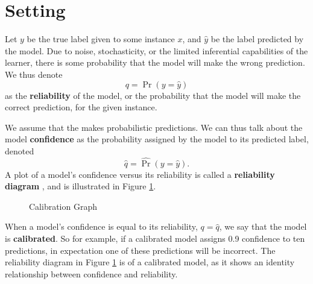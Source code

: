 
\section{Setting} \label{cddm:setting}

Let $y$ be the true label given to some instance $x$, and $\hat{y}$ be the label predicted by the model. Due to noise, stochasticity, or the limited inferential capabilities of the learner, there is some probability that the model will make the wrong prediction. We thus denote
\begin{equation}
q = \Pr(y=\hat{y})
\end{equation}
as the {\bf reliability} of the model, or the probability that the model will make the correct prediction, for the given instance. 

We assume that the makes probabilistic predictions. We can thus talk about the model {\bf confidence} as the probability assigned by the model to its predicted label, denoted
\begin{equation}
\hat{q} = \hat{\Pr}(y=\hat{y}).
\end{equation}
A plot of a model's confidence versus its reliability is called a {\bf reliability diagram} \cite{calibrating}, and is illustrated in Figure \ref{fig:calibration}. 

\newcommand{\calibrationgraph}[7][]{
    \draw [thick, <->] (0,1.25) -- (0,0) -- (1.25,0);
    \node [below] at (1.25,0) {$\hat{q}$};
    14
    \node [left] at (0,1.25) {$q$};
    \node [left] at (0,#7) {$q_t$};
    \node [below] at (#6,0) {$\hat{q}_t$};
    \draw (#2,#3) -- (#4,#5);
    \draw [red] (#6,0) -- (#6,#7);
    \draw [red, dashed] (0,#7) -- (#6,#7);
}

\begin{figure}
    \centering
    \caption{Calibration Graph}
    \label{fig:calibration}
\end{figure}

When a model's confidence is equal to its reliability, $q=\hat{q}$, we say that the model is {\bf calibrated}. So for example, if a calibrated model assigns 0.9 confidence to ten predictions, in expectation one of these predictions will be incorrect. The reliability diagram in Figure \ref{fig:calibration} is of a calibrated model, as it shows an identity relationship between confidence and reliability.


